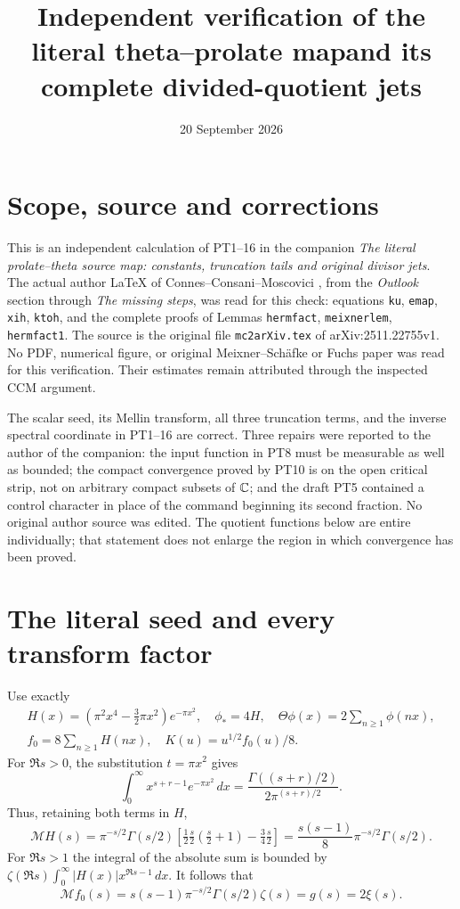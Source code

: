 \documentclass[11pt]{article}
\title{Independent verification of the literal theta--prolate map\newline and its complete divided-quotient jets}
\author{}\date{20 September 2026}
\begin{document}
\maketitle

\section{Scope, source and corrections}
This is an independent calculation of PT1--16 in the companion
\emph{The literal prolate--theta source map: constants, truncation tails and original divisor jets}.
The actual author LaTeX of Connes--Consani--Moscovici \cite{CCM},
from the \emph{Outlook} section through \emph{The missing steps},
was read for this check: equations \texttt{ku}, \texttt{emap},
\texttt{xih}, \texttt{ktoh}, and the complete proofs of Lemmas
\texttt{hermfact}, \texttt{meixnerlem}, \texttt{hermfact1}.
The source is the original file \texttt{mc2arXiv.tex} of
arXiv:2511.22755v1. No PDF, numerical figure, or original
Meixner--Sch\"afke or Fuchs paper was read for this verification.
Their estimates remain attributed through the inspected CCM argument.

The scalar seed, its Mellin transform, all three truncation terms,
and the inverse spectral coordinate in PT1--16 are correct.
Three repairs were reported to the author of the companion:
the input function in PT8 must be measurable as well as bounded;
the compact convergence proved by PT10 is on the open critical strip,
not on arbitrary compact subsets of $\mathbb C$;
and the draft PT5 contained a control character in place of
the command beginning its second fraction. No original author
source was edited. The quotient functions below are entire individually;
that statement does not enlarge the region in which convergence has
been proved.

\section{The literal seed and every transform factor}
Use exactly
\[
 \begin{gathered}
 H(x)=(\pi^2x^4-\tfrac32\pi x^2)e^{-\pi x^2},\quad
 \phi_*=4H,\quad \Theta\phi(x)=2\sum_{n\ge1}\phi(nx),\\
 f_0=8\sum_{n\ge1}H(nx),\quad K(u)=u^{1/2}f_0(u)/8.
 \end{gathered}
\]
For $\Re s>0$, the substitution $t=\pi x^2$ gives
\[
 \int_0^\infty x^{s+r-1}e^{-\pi x^2}\,dx
 =\frac{\Gamma((s+r)/2)}{2\pi^{(s+r)/2}}.
\]
Thus, retaining both terms in $H$,
\begin{equation}\tag{IC1}
 \mathcal MH(s)=\pi^{-s/2}\Gamma(s/2)
 \left[\tfrac12\tfrac s2(\tfrac s2+1)-\tfrac34\tfrac s2\right]
 =\frac{s(s-1)}8\pi^{-s/2}\Gamma(s/2).
\end{equation}
For $\Re s>1$ the integral of the absolute sum is bounded by
$\zeta(\Re s)\int_0^\infty|H(x)|x^{\Re s-1}\,dx$.
It follows that
\[
 \mathcal Mf_0(s)=s(s-1)\pi^{-s/2}\Gamma(s/2)\zeta(s)=g(s)=2\xi(s).
\]
\end{document}

